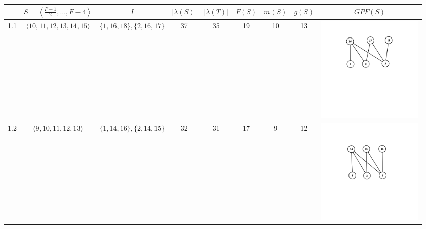 \documentclass[12pt]{article}
\begin{document}
\begin{center}
\begin{longtable}{ |c|c|c|c|c|c|c|c|c| } 
 \hline
  & $S=\left\langle \frac{F+1}{2},\dots,F-4\right\rangle$ & $I$ & $|\lambda(S)|$ & $|\lambda(T)|$ & $F(S)$ & $m(S)$ & $g(S)$ & $GPF(S)$ \\ 
 \hline
 1.1 & $\langle 10,11,12,13,14,15\rangle$ & $\{1,16,18\},\{2,16,17\}$ & 37 & 35 & 19 & 10 & 13 & \includegraphics[height=2in]{Table/graph1.1.png}\\
 \hline
 

 1.2 & $\langle 9,10,11,12,13\rangle$ & $\{1,14,16\},\{2,14,15\}$ & 32 & 31 & 17 & 9 & 12 & \includegraphics[height=2in]{Table/graph1.2.png}\\
 \hline
 \end{longtable}
\end{center}
\end{document}

